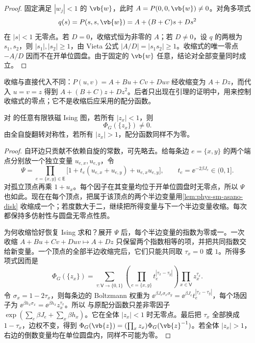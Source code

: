 \begin{proof}
固定满足 \(|w_j|<1\) 的 \(\vb{w}\)，此时 \(A=P(0,0,\vb{w})\ne0\)。对角多项式
\[
 q(s)=P(s,s,\vb{w})=A+(B+C)s+Ds^2
\]
在 \(|s|<1\) 无零点。若 \(D=0\)，收缩式恒为非零的 \(A\)；若 \(D\ne0\)，设 \(q\) 的两根为 \(s_1,s_2\)，则 \(|s_1|,|s_2|\ge1\)，由 Vieta 公式
\(|A/D|=|s_1s_2|\ge1\)。收缩式的唯一零点 \(-A/D\) 因而不在开单位圆盘。由于固定的 \(\vb{w}\) 任意，结论对全部变量同时成立。
\end{proof}

收缩与直接代入不同：\(P(u,v)=A+Bu+Cv+Duv\) 经收缩变为 \(A+Dz\)，而代入 \(u=v=z\) 得到 \(A+(B+C)z+Dz^2\)。后者只出现在引理的证明中，用来控制收缩式的零点；它不是收缩后应采用的配分函数。

\begin{theorem}
\label{thm:phys-sm-multivariate-lee-yang}
对 的任意有限铁磁 Ising 图，若所有 \(|z_x|<1\)，则
\[
 \Phi_G(\{z_x\})\neq0.
\]
由全自旋翻转对称性，若所有 \(|z_x|>1\)，配分函数同样不为零。
\end{theorem}

\begin{proof}
自环边只贡献不依赖自旋的常数，可先略去。给每条边 \(e=\{x,y\}\) 的两个端点分别放一个独立变量 \(u_{e,x},u_{e,y}\)，令
\[
 \Psi=\prod_{e=\{x,y\}\in\mathsf E}
   \bigl[1+t_e(u_{e,x}+u_{e,y})+u_{e,x}u_{e,y}\bigr],
 \qquad t_e=\ee^{-2\beta J_e}\in(0,1].
\]
对孤立顶点再乘 \(1+u_x\)。每个因子在其变量均位于开单位圆盘时无零点，所以 \(\Psi\) 也如此。现在在每个顶点，把属于该顶点的两个半边变量用\cref{lem:phys-sm-asano-disk} 收缩成一个；若度数大于二，继续把所得变量与下一个半边变量收缩。每次都保持多仿射性与圆盘无零点性质。

为何收缩恰好恢复 Ising 求和？展开 \(\Psi\) 后，每个半边变量的指数为零或一。一次收缩 \(A+Bu+Cv+Duv\mapsto A+Dz\) 只保留两个指数相等的项，并把共同指数交给新变量。一个顶点的全部半边收缩完后，它们只能共同取 \(\tau_x=0\) 或 \(1\)。所得多项式因而是
\begin{equation}
 \Phi_G(\{z_x\})
 =\sum_{\tau:\mathsf V\to\{0,1\}}
   \left(\prod_{e=\{x,y\}}t_e^{|\tau_x-\tau_y|}\right)
   \prod_{x\in\mathsf V}z_x^{\tau_x}.
 \label{eq:phys-sm-asano-recovered-ising}
\end{equation}
令 \(\sigma_x=1-2\tau_x\)，则每条边的 Boltzmann 权重为
\(\ee^{\beta J_e\sigma_x\sigma_y}=\ee^{\beta J_e}t_e^{|\tau_x-\tau_y|}\)，每个场因子为
\(\ee^{\beta h_x\sigma_x}=\ee^{\beta h_x}z_x^{\tau_x}\)。所以 与原配分函数只差非零因子
\(\exp(\sum_e\beta J_e+\sum_x\beta h_x)\)。它在全体 \(|z_x|<1\) 时无零点。最后把 \(\tau_x\) 全部换成 \(1-\tau_x\)，边权不变，得到
\(\Phi_G(\vb{z})=(\prod_xz_x)\Phi_G(\vb{z}^{-1})\)。若全体 \(|z_x|>1\)，右边的倒数变量均在单位圆盘内，同样不可能为零。
\end{proof}

